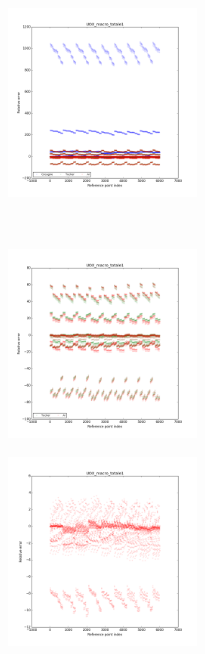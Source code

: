 \begin{center}
\begin{figure}[!h]
\end{figure}
\begin{figure}[!h]\ContinuedFloat
		\centering
		\begin{subfigure}[b]{0.45\textwidth}
				\includegraphics[width=\linewidth,height=5cm]{images/UOX/UOX_macro_totale1_with_cocagne.png}
		\end{subfigure}
		~
		\begin{subfigure}[b]{0.45\textwidth}
				\includegraphics[width=\linewidth,height=5cm]{images/UOX/UOX_macro_totale1.png}
		\end{subfigure}
		\begin{subfigure}[b]{0.45\textwidth}
				\includegraphics[width=\linewidth,height=5cm]{images/UOX/UOX_macro_totale1_alone.png}
		\end{subfigure}
\end{figure}


\end{center}
